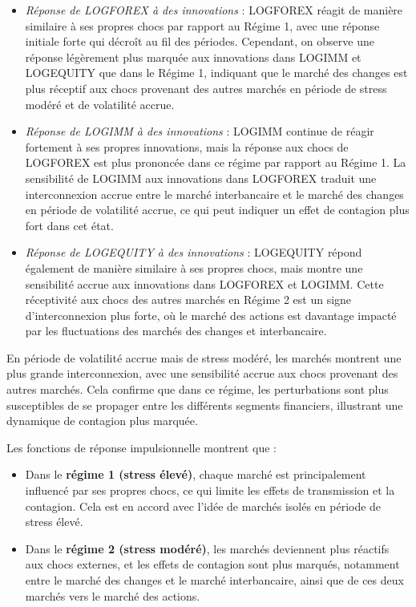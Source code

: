\begin{itemize}
    \item \textit{Réponse de LOGFOREX à des innovations} : LOGFOREX réagit de manière similaire à ses propres chocs par rapport au Régime 1, avec une réponse initiale forte qui décroît au fil des périodes. Cependant, on observe une réponse légèrement plus marquée aux innovations dans LOGIMM et LOGEQUITY que dans le Régime 1, indiquant que le marché des changes est plus réceptif aux chocs provenant des autres marchés en période de stress modéré et de volatilité accrue.
    
    \item \textit{Réponse de LOGIMM à des innovations} : LOGIMM continue de réagir fortement à ses propres innovations, mais la réponse aux chocs de LOGFOREX est plus prononcée dans ce régime par rapport au Régime 1. La sensibilité de LOGIMM aux innovations dans LOGFOREX traduit une interconnexion accrue entre le marché interbancaire et le marché des changes en période de volatilité accrue, ce qui peut indiquer un effet de contagion plus fort dans cet état.
    
    \item \textit{Réponse de LOGEQUITY à des innovations} : LOGEQUITY répond également de manière similaire à ses propres chocs, mais montre une sensibilité accrue aux innovations dans LOGFOREX et LOGIMM. Cette réceptivité aux chocs des autres marchés en Régime 2 est un signe d’interconnexion plus forte, où le marché des actions est davantage impacté par les fluctuations des marchés des changes et interbancaire.
\end{itemize}

En période de volatilité accrue mais de stress modéré, les marchés montrent une plus grande interconnexion, avec une sensibilité accrue aux chocs provenant des autres marchés. Cela confirme que dans ce régime, les perturbations sont plus susceptibles de se propager entre les différents segments financiers, illustrant une dynamique de contagion plus marquée.

\vspace{0.5cm}

Les fonctions de réponse impulsionnelle montrent que :
\begin{itemize}
    \item Dans le \textbf{régime 1 (stress élevé)}, chaque marché est principalement influencé par ses propres chocs, ce qui limite les effets de transmission et la contagion. Cela est en accord avec l'idée de marchés isolés en période de stress élevé.
    \item Dans le \textbf{régime 2 (stress modéré)}, les marchés deviennent plus réactifs aux chocs externes, et les effets de contagion sont plus marqués, notamment entre le marché des changes et le marché interbancaire, ainsi que de ces deux marchés vers le marché des actions.
\end{itemize}

